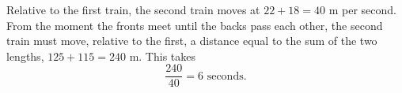 Relative to the first train, the second train moves at $22+18=40$ m per second. From the moment the fronts meet until the backs pass each other, the second train must move, relative to the first, a distance equal to the sum of the two lengths, $125+115=240$ m. This takes
\[\dfrac{240}{40}=\boxed{6}\text{ seconds}.\]

